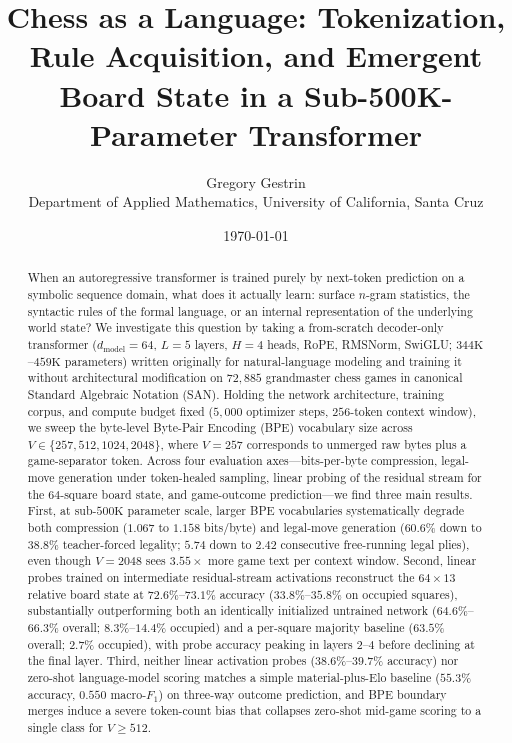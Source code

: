 \documentclass[11pt]{article}
\title{Chess as a Language: Tokenization, Rule Acquisition, and Emergent Board State in a Sub-500K-Parameter Transformer}
\author{Gregory Gestrin \\ \small Department of Applied Mathematics, University of California, Santa Cruz}
\date{\today}
\begin{document}
\maketitle

\begin{abstract}
\noindent
When an autoregressive transformer is trained purely by next-token prediction on a symbolic sequence domain, what does it actually learn: surface $n$-gram statistics, the syntactic rules of the formal language, or an internal representation of the underlying world state? We investigate this question by taking a from-scratch decoder-only transformer ($d_{\mathrm{model}}=64$, $L=5$ layers, $H=4$ heads, RoPE, RMSNorm, SwiGLU; $344\mathrm{K}$--$459\mathrm{K}$ parameters) written originally for natural-language modeling and training it without architectural modification on $72{,}885$ grandmaster chess games in canonical Standard Algebraic Notation (SAN). Holding the network architecture, training corpus, and compute budget fixed ($5{,}000$ optimizer steps, $256$-token context window), we sweep the byte-level Byte-Pair Encoding (BPE) vocabulary size across $V \in \{257, 512, 1024, 2048\}$, where $V=257$ corresponds to unmerged raw bytes plus a game-separator token. Across four evaluation axes---bits-per-byte compression, legal-move generation under token-healed sampling, linear probing of the residual stream for the $64$-square board state, and game-outcome prediction---we find three main results. First, at sub-$500\mathrm{K}$ parameter scale, larger BPE vocabularies systematically degrade both compression ($1.067$ to $1.158$ bits/byte) and legal-move generation ($60.6\%$ down to $38.8\%$ teacher-forced legality; $5.74$ down to $2.42$ consecutive free-running legal plies), even though $V=2048$ sees $3.55\times$ more game text per context window. Second, linear probes trained on intermediate residual-stream activations reconstruct the $64\times 13$ relative board state at $72.6\%$--$73.1\%$ accuracy ($33.8\%$--$35.8\%$ on occupied squares), substantially outperforming both an identically initialized untrained network ($64.6\%$--$66.3\%$ overall; $8.3\%$--$14.4\%$ occupied) and a per-square majority baseline ($63.5\%$ overall; $2.7\%$ occupied), with probe accuracy peaking in layers $2$--$4$ before declining at the final layer. Third, neither linear activation probes ($38.6\%$--$39.7\%$ accuracy) nor zero-shot language-model scoring matches a simple material-plus-Elo baseline ($55.3\%$ accuracy, $0.550$ macro-$F_1$) on three-way outcome prediction, and BPE boundary merges induce a severe token-count bias that collapses zero-shot mid-game scoring to a single class for $V \ge 512$.
\end{abstract}
\end{document}
